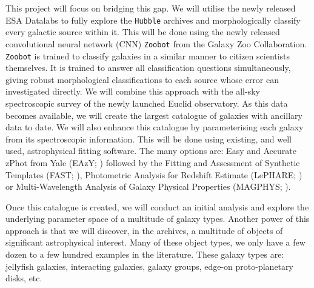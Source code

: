 \documentclass[11pt,usenatbib]{article}
\begin{document}
This project will focus on bridging this gap. We will utilise the newly released ESA Datalabs to fully explore the \texttt{Hubble} archives and morphologically classify every galactic source within it. This will be done using the newly released convolutional neural network (CNN) \texttt{Zoobot} \citep{Zoobot paper} from the Galaxy Zoo Collaboration. \texttt{Zoobot} is trained to classify galaxies in a similar manner to citizen scientists themselves. It is trained to answer all classification questions simultaneously, giving robust morphological classifications to each source whose error can investigated directly. We will combine this approach with the all-sky spectroscopic survey of the newly launched Euclid observatory. As this data becomes available, we will create the largest catalogue of galaxies with ancillary data to date. We will also enhance this catalogue by parameterising each galaxy from its spectroscopic information. This will be done using existing, and well used, astrophysical fitting software. The many options are: Easy and Accurate zPhot from Yale (EAzY; \citet{Brammer et al. 2008}) followed by the Fitting and Assessment of Synthetic Templates (FAST; \citet{Kriek et al 2009}), Photometric Analysis for Redshift Estimate (LePHARE; \citet{Arnouts et al. 1999, Ilbert et al. 2006}) or Multi-Wavelength Analysis of Galaxy Physical Properties (MAGPHYS; \citet{da Cunha et al. (2008)}).

Once this catalogue is created, we will conduct an initial analysis and explore the underlying parameter space of a multitude of galaxy types. Another power of this approach is that we will discover, in the archives, a multitude of objects of significant astrophysical interest. Many of these object types, we only have a few dozen to a few hundred examples in the literature. These galaxy types are: jellyfish galaxies, interacting galaxies, galaxy groups, edge-on proto-planetary disks, etc.
\end{document}
